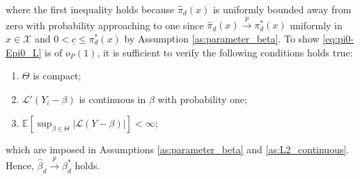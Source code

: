 \documentclass[11pt]{article}
\numberwithin{equation}{section}
\begin{document}
where the first inequality holds because $\widehat{\pi}_d(x)$ is uniformly bounded away from zero with probability approaching to one since $\widehat{\pi}_d(x)\xrightarrow{p} \pi_d^*(x)$ uniformly in $x\in\mathcal{X}$ and $0<\underline{c}\leq \pi_d^*(x)$ by Assumption \ref{as:parameter_beta}. To show \eqref{eq:pi0-Epi0_L} is of $o_P(1)$, it is sufficient to verify the following conditions holds true:
\begin{enumerate}
	\item $\Theta$ is compact;
	\item $\mathcal{L}'(Y_i-\beta)$ is continuous in $\beta$ with probability one;
	\item $\mathbb{E}\left[\sup_{\beta\in \Theta}|\mathcal{L}(Y-\beta)|\right]<\infty$;
\end{enumerate}
which are imposed in  Assumptions \ref{as:parameter_beta} and \ref{as:L2_continuous}. Hence, $\widehat{\beta}_d\xrightarrow{p}\beta_d^*$ holds.
\end{document}
